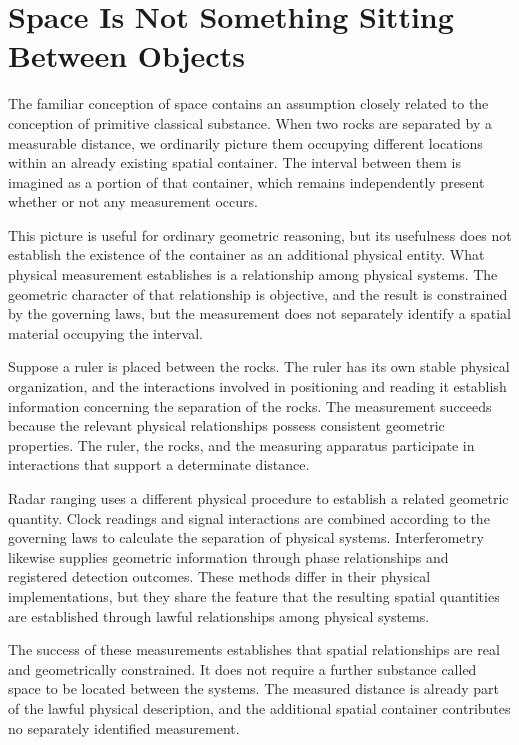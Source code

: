 \documentclass[12pt,onecolumn]{article}
\begin{document}
\section{Space Is Not Something Sitting Between Objects}

The familiar conception of space contains an assumption closely related to the conception of primitive classical substance. When two rocks are separated by a measurable distance, we ordinarily picture them occupying different locations within an already existing spatial container. The interval between them is imagined as a portion of that container, which remains independently present whether or not any measurement occurs.

This picture is useful for ordinary geometric reasoning, but its usefulness does not establish the existence of the container as an additional physical entity. What physical measurement establishes is a relationship among physical systems. The geometric character of that relationship is objective, and the result is constrained by the governing laws, but the measurement does not separately identify a spatial material occupying the interval.

Suppose a ruler is placed between the rocks. The ruler has its own stable physical organization, and the interactions involved in positioning and reading it establish information concerning the separation of the rocks. The measurement succeeds because the relevant physical relationships possess consistent geometric properties. The ruler, the rocks, and the measuring apparatus participate in interactions that support a determinate distance.

Radar ranging uses a different physical procedure to establish a related geometric quantity. Clock readings and signal interactions are combined according to the governing laws to calculate the separation of physical systems. Interferometry likewise supplies geometric information through phase relationships and registered detection outcomes. These methods differ in their physical implementations, but they share the feature that the resulting spatial quantities are established through lawful relationships among physical systems.

The success of these measurements establishes that spatial relationships are real and geometrically constrained. It does not require a further substance called space to be located between the systems. The measured distance is already part of the lawful physical description, and the additional spatial container contributes no separately identified measurement.
\end{document}

